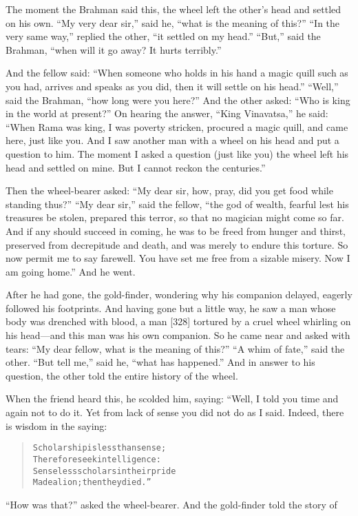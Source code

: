 \documentclass[article, twoside, 14pt]{memoir}
\renewenvironment{verbatim}{%
\begin{quote}%
\vskip -10pt%
\begin{alltt}\normalfont\large}{\end{alltt}%
\end{quote}%
\vskip -10pt
} %
\begin{document}
The moment the Brahman said this, the wheel left the other's head
and settled on his own. ``My very dear sir,'' said he,
``what is the meaning of this?'' ``In the very same way,'' replied
the other, ``it settled on my head.'' ``But,'' said the Brahman,
``when will it go away? It hurts terribly.''

And the fellow said:
``When someone who holds in his hand a magic quill such as you had, arrives and speaks as you did, then it will settle on his head.''
``Well,'' said the Brahman, ``how long were you here?'' And the
other asked: ``Who is king in the world at present?'' On hearing
the answer, ``King Vinavatsa,'' he said:
``When Rama was king, I was poverty stricken, procured a magic quill, and came here, just like you. And I saw another man with a wheel on his head and put a question to him. The moment I asked a question (just like you) the wheel left his head and settled on mine. But I cannot reckon the centuries.''

Then the wheel-bearer asked:
``My dear sir, how, pray, did you get food while standing thus?''
``My dear sir,'' said the fellow,
``the god of wealth, fearful lest his treasures be stolen, prepared this terror, so that no magician might come so far. And if any should succeed in coming, he was to be freed from hunger and thirst, preserved from decrepitude and death, and was merely to endure this torture. So now permit me to say farewell. You have set me free from a sizable misery. Now I am going home.''
And he went.

After he had gone, the gold-finder, wondering why his companion
delayed, eagerly followed his footprints. And having gone but a
little way, he saw a man whose body was drenched with blood, a man
[328] tortured by a cruel wheel whirling on his head---and this man
was his own companion. So he came near and asked with tears:
``My dear fellow, what is the meaning of this?''
``A whim of fate,'' said the other. ``But tell me,'' said he,
``what has happened.'' And in answer to his question, the other
told the entire history of the wheel.

When the friend heard this, he scolded him, saying: “Well, I told
you time and again not to do it. Yet from lack of sense you did not
do as I said. Indeed, there is wisdom in the saying:

\begin{verbatim}
Scholarship is less than sense;
Therefore seek intelligence:
Senseless scholars in their pride
Made a lion; then they died.”
\end{verbatim}
``How was that?'' asked the wheel-bearer. And the gold-finder told
the story of
\end{document}
